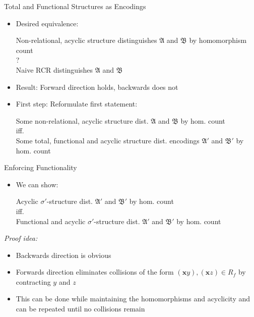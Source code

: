 \documentclass[aspectratio=169]{beamer}
\begin{document}
	\begin{frame}{Total and Functional Structures as Encodings}
		\begin{itemize}
			\item Desired equivalence: 
			\begin{center}
				Non-relational, acyclic structure distinguishes $\mathfrak A$ and $\mathfrak B$ by homomorphism count \\ 
				? \\
				Naive RCR distinguishes $\mathfrak A$ and $\mathfrak B$
			\end{center}
			\item Result: Forward direction holds, backwards does not
			\item First step: Reformulate first statement:
			\begin{center}
				Some non-relational, acyclic structure dist. $\mathfrak A$ and $\mathfrak B$ by hom. count\\
				iff.\\
				Some total, functional and acyclic structure dist. encodings $\mathfrak A'$ and $\mathfrak B'$ by hom. count
			\end{center}
		\end{itemize}
	\end{frame}
	
	\begin{frame}{Enforcing Functionality}
		\begin{itemize}
			\item We can show:
			\begin{center}
				Acyclic $\sigma'$-structure dist. $\mathfrak A'$ and $\mathfrak B'$ by hom. count \\
				iff. \\
				Functional and acyclic $\sigma'$-structure dist. $\mathfrak A'$ and $\mathfrak B'$ by hom. count
			\end{center}
		\end{itemize}
		\emph{Proof idea:}
		\begin{itemize}
			\item Backwards direction is obvious
			\item Forwards direction eliminates collisions of the form $(\mathbf xy),(\mathbf xz)\in R_f$ by contracting $y$ and $z$
			\item This can be done while maintaining the homomorphisms and acyclicity and can be repeated until no collisions remain
		\end{itemize}
	\end{frame}
	
\end{document}
